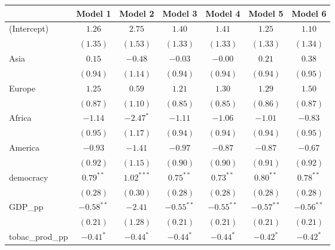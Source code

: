 
\begin{table}[!h]
\begin{center}
\begin{tabular}{l c c c c c c }
\toprule
 & Model 1 & Model 2 & Model 3 & Model 4 & Model 5 & Model 6 \\
\midrule
(Intercept)             & $1.26$       & $2.75$       & $1.40$       & $1.41$       & $1.25$       & $1.10$       \\
                        & $(1.35)$     & $(1.53)$     & $(1.33)$     & $(1.33)$     & $(1.33)$     & $(1.34)$     \\
Asia                    & $0.15$       & $-0.48$      & $-0.03$      & $-0.00$      & $0.21$       & $0.38$       \\
                        & $(0.94)$     & $(1.14)$     & $(0.94)$     & $(0.94)$     & $(0.94)$     & $(0.95)$     \\
Europe                  & $1.25$       & $0.59$       & $1.21$       & $1.30$       & $1.29$       & $1.50$       \\
                        & $(0.87)$     & $(1.10)$     & $(0.85)$     & $(0.85)$     & $(0.86)$     & $(0.87)$     \\
Africa                  & $-1.14$      & $-2.47^{*}$  & $-1.11$      & $-1.06$      & $-1.01$      & $-0.83$      \\
                        & $(0.95)$     & $(1.17)$     & $(0.94)$     & $(0.94)$     & $(0.94)$     & $(0.95)$     \\
America                 & $-0.93$      & $-1.41$      & $-0.97$      & $-0.87$      & $-0.87$      & $-0.67$      \\
                        & $(0.92)$     & $(1.15)$     & $(0.90)$     & $(0.90)$     & $(0.91)$     & $(0.92)$     \\
democracy               & $0.79^{**}$  & $1.02^{***}$ & $0.75^{**}$  & $0.73^{**}$  & $0.80^{**}$  & $0.78^{**}$  \\
                        & $(0.28)$     & $(0.30)$     & $(0.28)$     & $(0.28)$     & $(0.28)$     & $(0.28)$     \\
GDP\_pp                 & $-0.58^{**}$ & $-2.41$      & $-0.55^{**}$ & $-0.55^{**}$ & $-0.57^{**}$ & $-0.56^{**}$ \\
                        & $(0.21)$     & $(1.28)$     & $(0.21)$     & $(0.21)$     & $(0.21)$     & $(0.21)$     \\
tobac\_prod\_pp         & $-0.41^{*}$  & $-0.44^{*}$  & $-0.44^{*}$  & $-0.44^{*}$  & $-0.42^{*}$  & $-0.42^{*}$  \\

\end{tabular}
\end{center}
\end{table}

